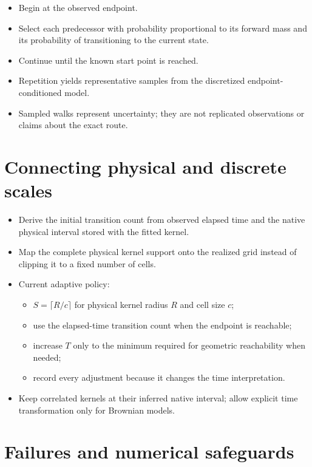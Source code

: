 \begin{itemize}
  \item Begin at the observed endpoint.
  \item Select each predecessor with probability proportional to its forward mass and its probability of transitioning to the current state.
  \item Continue until the known start point is reached.
  \item Repetition yields representative samples from the discretized endpoint-conditioned model.
  \item Sampled walks represent uncertainty; they are not replicated observations or claims about the exact route.
\end{itemize}

\section{Connecting physical and discrete scales}

\begin{itemize}
  \item Derive the initial transition count from observed elapsed time and the native physical interval stored with the fitted kernel.
  \item Map the complete physical kernel support onto the realized grid instead of clipping it to a fixed number of cells.
  \item Current adaptive policy:
  \begin{itemize}
    \item $S=\lceil R/c\rceil$ for physical kernel radius $R$ and cell size $c$;
    \item use the elapsed-time transition count when the endpoint is reachable;
    \item increase $T$ only to the minimum required for geometric reachability when needed;
    \item record every adjustment because it changes the time interpretation.
  \end{itemize}
  \item Keep correlated kernels at their inferred native interval; allow explicit time transformation only for Brownian models.
\end{itemize}

\section{Failures and numerical safeguards}

